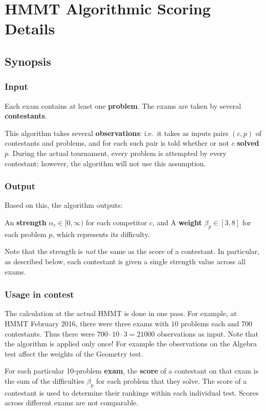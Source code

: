 \chapter{HMMT Algorithmic Scoring Details}
\section{Synopsis}
\subsection{Input}
Each exam contains at least one \textbf{problem}.
The exams are taken by several \textbf{contestants}.

This algorithm takes several \textbf{observations}:
i.e.\ it takes as inputs pairs $(c,p)$ of contestants and problems,
and for each such pair is told whether or not $c$ \textbf{solved} $p$.
During the actual tournament, every problem is attempted by every contestant;
however, the algorithm will not use this assumption.

\subsection{Output}
Based on this, the algorithm outputs:
\begin{itemize}
	\ii An \textbf{strength} $\alpha_c \in [0,\infty)$ for each competitor $c$, and
	\ii A \textbf{weight} $\beta_p \in [3,8]$ for each problem $p$,
	which represents its difficulty.
\end{itemize}
Note that the strength is \emph{not} the same as the score of a contestant.
In particular, as described below,
each contestant is given a single strength value across all exams.

\subsection{Usage in contest}
The calculation at the actual HMMT is done in one pass.
For example, at HMMT February 2016, there were three exams with $10$ problems
each and $700$ contestants.
Thus there were $700 \cdot 10 \cdot 3 = 21000$ observations as input.
Note that the algorithm is applied only once!
For example the observations on the Algebra test
affect the weights of the Geometry test.

For each particular 10-problem \textbf{exam},
the \textbf{score} of a contestant on that exam is the sum of the 
difficulties $\beta_p$ for each problem that they solve.
The score of a contestant is used to determine their rankings
within each individual test.
Scores across different exams are not comparable.

